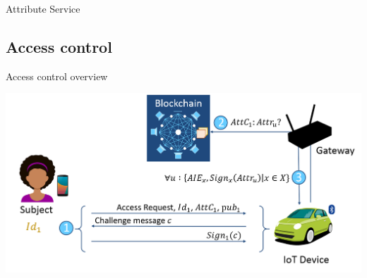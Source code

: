 \begin{frame}{Attribute Service}
\begin{center}
    \end{center}
\end{frame}

\subsection{Access control}

\begin{frame}{Access control overview}
    \begin{center}
        \includegraphics[scale=0.42]{Figures/MAAC-B_AC.png}
    \end{center}
\end{frame}

